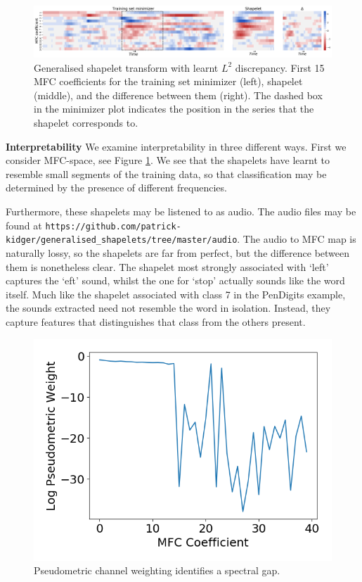 \documentclass{article}
\theoremstyle{plain}
\theoremstyle{definition}
\newcommand{\boldheading}[1]{

\textbf{#1}\quad}
\begin{document}
\begin{figure}
			\centering
			\includegraphics[width=\linewidth]{images/new_speech_commands_heatmap.png}
			\caption{Generalised shapelet transform with learnt $L^2$ discrepancy. First 15 MFC coefficients for the training set minimizer (left), shapelet (middle), and the difference between them (right). The dashed box in the minimizer plot indicates the position in the series that the shapelet corresponds to.}\label{fig:speech_commands}
\end{figure}

\boldheading{Interpretability} We examine interpretability in three different ways. First we consider MFC-space, see Figure \ref{fig:speech_commands}. We see that the shapelets have learnt to resemble small segments of the training data, so that classification may be determined by the presence of different frequencies.

Furthermore, these shapelets may be listened to as audio. The audio files may be found at \texttt{https://github.com/patrick-kidger/generalised\_shapelets/tree/master/audio}. The audio to MFC map is naturally lossy, so the shapelets are far from perfect, but the difference between them is nonetheless clear. The shapelet most strongly associated with `left' captures the `eft' sound, whilst the one for `stop' actually sounds like the word itself. Much like the shapelet associated with class 7 in the PenDigits example, the sounds extracted need not resemble the word in isolation. Instead, they capture features that distinguishes that class from the others present.

\begin{figure}\centering
\vspace{-1em}
\includegraphics[width=\linewidth]{images/spectral.png}
\vspace{-2em}
\caption{Pseudometric channel weighting identifies a spectral gap.}\label{fig:spectral}
\end{figure}
\end{document}
